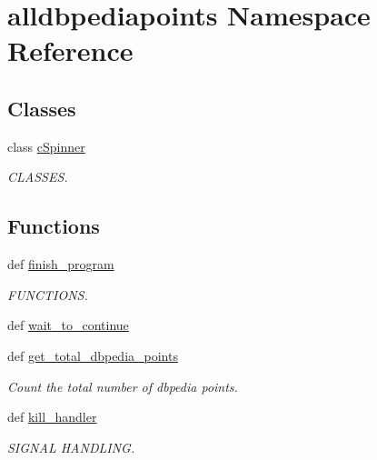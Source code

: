 \hypertarget{namespacealldbpediapoints}{\section{alldbpediapoints \-Namespace \-Reference}
\label{namespacealldbpediapoints}
}
\subsection*{\-Classes}
\begin{DoxyCompactItemize}
\item 
class \hyperlink{classalldbpediapoints_1_1cSpinner}{c\-Spinner}
\begin{DoxyCompactList}\small\item\em \-C\-L\-A\-S\-S\-E\-S. \end{DoxyCompactList}\end{DoxyCompactItemize}
\subsection*{\-Functions}
\begin{DoxyCompactItemize}
\item 
def \hyperlink{namespacealldbpediapoints_aaec8066f21e8feca8af72f06950032ef}{finish\-\_\-program}
\begin{DoxyCompactList}\small\item\em \-F\-U\-N\-C\-T\-I\-O\-N\-S. \end{DoxyCompactList}\item 
def \hyperlink{namespacealldbpediapoints_a8ee0c7095504249e8c8489846e8daa8e}{wait\-\_\-to\-\_\-continue}
\item 
def \hyperlink{namespacealldbpediapoints_ad95dd1eda2480215bd86bdbe7294db2e}{get\-\_\-total\-\_\-dbpedia\-\_\-points}
\begin{DoxyCompactList}\small\item\em \-Count the total number of dbpedia points. \end{DoxyCompactList}\item 
def \hyperlink{namespacealldbpediapoints_a144b7a2a48519add54b2a8c8dfd41395}{kill\-\_\-handler}
\begin{DoxyCompactList}\small\item\em \-S\-I\-G\-N\-A\-L \-H\-A\-N\-D\-L\-I\-N\-G. \end{DoxyCompactList}\end{DoxyCompactItemize}

